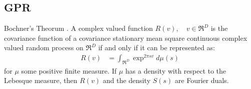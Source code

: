 \subsection{GPR}
\begin{thm} Bochner's Theorum \cite{rasmussen2006gaussian}. A complex valued  function $R(v), \quad v \in \Re^D$  is the covariance function of a covariance stationary mean square continuous complex valued random process on $\Re^D$ if and only if it can be represented as:  
\begin{align}
R(v) & = \int_{\Re^D} \exp^{2 \pi s v} d\mu(s) \label{eqn:bochnerthm}
\end{align}
for $\mu$ some positive finite measure. If $\mu$ has a density with respect to the Lebesque measure, then $R(v)$ and the density $S(s)$ are Fourier duals.
\end{thm}

